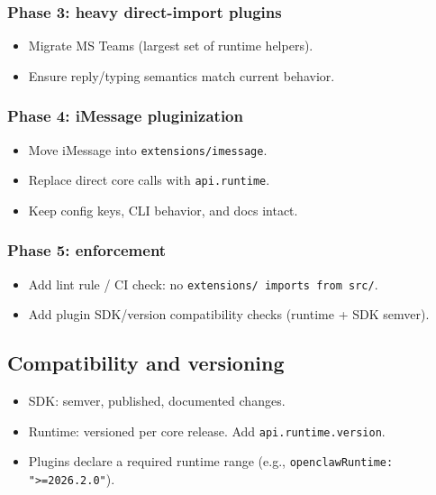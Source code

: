 \subsubsection{Phase 3: heavy direct-import plugins}


\begin{itemize}
  \item Migrate MS Teams (largest set of runtime helpers).
  \item Ensure reply/typing semantics match current behavior.
\end{itemize}


\subsubsection{Phase 4: iMessage pluginization}


\begin{itemize}
  \item Move iMessage into \texttt{extensions/imessage}.
  \item Replace direct core calls with \texttt{api.runtime}.
  \item Keep config keys, CLI behavior, and docs intact.
\end{itemize}


\subsubsection{Phase 5: enforcement}


\begin{itemize}
  \item Add lint rule / CI check: no \texttt{extensions/\textbf{} imports from \texttt{src/}}.
  \item Add plugin SDK/version compatibility checks (runtime + SDK semver).
\end{itemize}


\subsection{Compatibility and versioning}


\begin{itemize}
  \item SDK: semver, published, documented changes.
  \item Runtime: versioned per core release. Add \texttt{api.runtime.version}.
  \item Plugins declare a required runtime range (e.g., \texttt{openclawRuntime: ">=2026.2.0"}).
\end{itemize}


